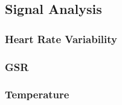 
\subsection{Signal Analysis}




\subsubsection{Heart Rate Variability}

\subsubsection{GSR}

\subsubsection{Temperature}
